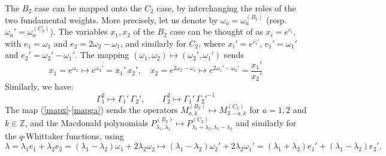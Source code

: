 \documentclass[12pt]{amsart}
\newcommand{\Z}{{\mathbb Z}}
\numberwithin{equation}{section}
\numberwithin{table}{section}
\begin{document}
\begin{appendix}
The $B_2$ case can be mapped onto the $C_2$ case, by interchanging the roles of the two fundamental weights. More precisely, let us denote by $\omega_a=\omega_a^{(B_2)}$ (resp. $\omega_a'=\omega_a^{(C_2)}$). The variables $x_1,x_2$ of the $B_2$ case can be thought of as
$x_i=e^{e_i}$, with  $e_1=\omega_1$ and $e_2=2\omega_2-\omega_1$,
and similarly for $C_2$, where $x_i'=e^{e_i'}$, $e_1'=\omega_1'$ and $e_2'=\omega_2'-\omega_1'$. The mapping 
$(\omega_1,\omega_2)\mapsto (\omega_2',\omega_1')$ sends
\begin{equation}\label{mapx} x_1=e^{\omega_1}\mapsto e^{\omega_2'}=x_1'\, x_2', \quad x_2=e^{2\omega_2-\omega_1}\mapsto e^{2\omega_1'-\omega_2'}=\frac{x_1'}{x_2'}
\end{equation}
Similarly, we have:
\begin{equation}\label{mapga} \Gamma_1^2 \mapsto \Gamma_1'\, \Gamma_2',\qquad \Gamma_2^2\mapsto \Gamma_1'\, {\Gamma_2'}^{-1}
\end{equation}
The map (\ref{mapx}-\ref{mapga}) sends the operators $M_{a,k}^{(B_2)}\mapsto M_{3-a,k}^{(C_2)}$ for $a=1,2$ and $k\in \Z$,
and the Macdonald polynomials $P_{\lambda_1,\lambda_2}^{(B_2)}\mapsto P_{\lambda_1+\lambda_2,\lambda_1-\lambda_2}^{(C_2)}$ and similarly for the $q$-Whittaker functions,
using
$$ \lambda=\lambda_1 e_1+\lambda_2 e_2=(\lambda_1-\lambda_2)\omega_1+2\lambda_2 \omega_2\mapsto 
(\lambda_1-\lambda_2)\omega_2'+2\lambda_2 \omega_1'=(\lambda_1+\lambda_2)e_1'+(\lambda_1-\lambda_2)e_2' .$$



\end{appendix}
\end{document}
